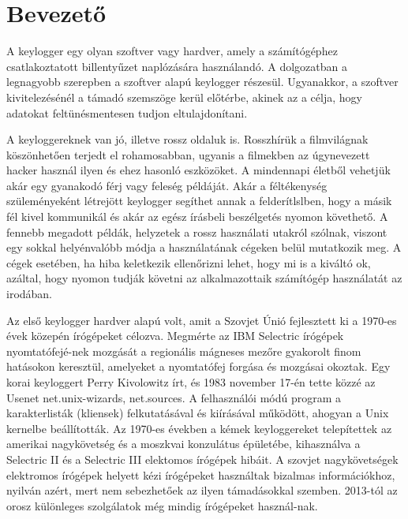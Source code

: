 \documentclass[a4paper, 11pt]{article}
\begin{document}
\renewcommand{\listfigurename}{Ábrák jegyzéke}
\listoffigures
\thispagestyle{empty}
\cleardoublepage

\renewcommand{\listtablename}{Táblázatok jegyzéke}
\listoftables
\thispagestyle{empty}
\cleardoublepage

\setcounter{page}{1}
\setlength{\parindent}{0.5cm}

\section{Bevezető}\label{sec:intro}
A keylogger egy olyan szoftver vagy hardver, amely a számítógéphez csatlakoztatott billentyűzet naplózására használandó. A dolgozatban a legnagyobb szerepben a szoftver alapú keylogger részesül. Ugyanakkor, a szoftver kivitelezésénél a támadó szemszöge kerül előtérbe, akinek az a célja, hogy adatokat feltünésmentesen tudjon eltulajdonítani.

A keyloggereknek van jó, illetve rossz oldaluk is. Rosszhírük a filmvilágnak köszönhetően terjedt el rohamosabban, ugyanis a filmekben az úgynevezett hacker használ ilyen és ehez hasonló eszközöket. A mindennapi életből vehetjük akár egy gyanakodó férj vagy feleség példáját. Akár a féltékenység szüleményeként létrejött keylogger segíthet annak a felderítlslben, hogy a másik fél kivel kommunikál és akár az egész írásbeli beszélgetés nyomon követhető. A fennebb megadott példák, helyzetek a rossz használati utakról szólnak, viszont egy sokkal helyénvalóbb módja a használatának cégeken belül mutatkozik meg. A cégek esetében, ha hiba keletkezik ellenőrizni lehet, hogy mi is a kiváltó ok, azáltal, hogy nyomon tudják követni az alkalmazottaik számítógép használatát az irodában.

Az első keylogger hardver alapú volt, amit a Szovjet Únió fejlesztett ki a 1970-es évek közepén írógépeket célozva. Megmérte az IBM Selectric írógépek nyomtatófejé-nek mozgását a regionális mágneses mezőre gyakorolt finom hatásokon keresztül, amelyeket a nyomtatófej forgása és mozgásai okoztak. Egy korai keyloggert Perry Kivolowitz írt, és 1983 november 17-én tette közzé az Usenet net.unix-wizards, net.sources. A felhasználói módú program a karakterlisták (kliensek) felkutatásával és kiírásával működött, ahogyan a Unix kernelbe beállították. Az 1970-es években a kémek keyloggereket telepítettek az amerikai nagykövetség és a moszkvai konzulátus épületébe, kihasználva a Selectric II és a Selectric III elektomos írógépek hibáit. A szovjet nagykövetségek elektromos írógépek helyett kézi írógépeket használtak bizalmas információkhoz, nyilván azért, mert nem sebezhetőek az ilyen támadásokkal szemben. 2013-tól az orosz különleges szolgálatok még mindig írógépeket használ-nak.
\end{document}
